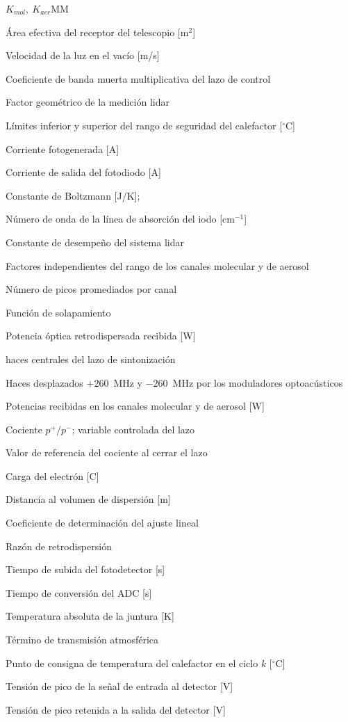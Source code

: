 \begin{listasimbolos}{$K_{mol},\ K_{aer}$MM}
\item[$A$] Área efectiva del receptor del telescopio [m$^2$]
\item[$c$] Velocidad de la luz en el vacío [m/s]
\item[$\mathrm{coe}$] Coeficiente de banda muerta multiplicativa del lazo de control
\item[$G(R)$] Factor geométrico de la medición lidar
\item[$h_{\min},\ h_{\max}$] Límites inferior y superior del rango de seguridad del calefactor [$^{\circ}$C]
\item[$I_L$] Corriente fotogenerada [A]
\item[$I_O$] Corriente de salida del fotodiodo [A]
\item[$k$] Constante de Boltzmann [J/K]; 
\item[$k_i$] Número de onda de la línea de absorción del iodo [cm$^{-1}$]
\item[$K$] Constante de desempeño del sistema lidar
\item[$K_{mol},\ K_{aer}$] Factores independientes del rango de los canales molecular y de aerosol
\item[$n$] Número de picos promediados por canal
\item[$O(r)$] Función de solapamiento
\item[$P(r)$] Potencia óptica retrodispersada recibida [W]
\item[$P_0$] haces centrales del lazo de sintonización
\item[$P_+,\ P_-$] Haces desplazados $+260$~MHz y $-260$~MHz por los moduladores optoacústicos
\item[$P_{mol},\ P_{aer}$] Potencias recibidas en los canales molecular y de aerosol [W]
\item[$\mathit{prt}$] Cociente $p^{+}/p^{-}$; variable controlada del lazo
\item[$\mathit{prt}_{\mathrm{ref}}$] Valor de referencia del cociente al cerrar el lazo
\item[$q$] Carga del electrón [C]
\item[$r,\ R$] Distancia al volumen de dispersión [m]
\item[$R^2$] Coeficiente de determinación del ajuste lineal
\item[$\Re(r)$] Razón de retrodispersión
\item[$t_r$] Tiempo de subida del fotodetector [s]
\item[$t_{\mathrm{conv}}$] Tiempo de conversión del ADC [s]
\item[$T$] Temperatura absoluta de la juntura [K]
\item[$T(R)$] Término de transmisión atmosférica
\item[$T(k)$] Punto de consigna de temperatura del calefactor en el ciclo $k$ [$^{\circ}$C]
\item[$V_{\mathrm{in}}$] Tensión de pico de la señal de entrada al detector [V]
\item[$V_O$] Tensión de pico retenida a la salida del detector [V]
\end{listasimbolos}

